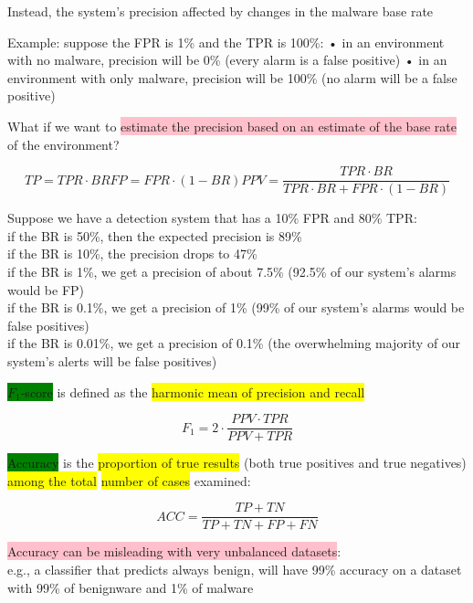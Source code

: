 \documentclass[]{project_plan}
\begin{document}
Instead, the system’s precision affected by changes in the malware base rate

Example: suppose the FPR is 1\% and the TPR is 100\%:
• in an environment with no malware, precision will be 0\% (every alarm is a false positive)
• in an environment with only malware, precision will be 100\% (no alarm will be a false positive)

What if we want to \colorbox{pink}{estimate the precision based on an estimate of the base rate} of the environment?

\[
  TP = TPR \cdot BR
  FP = FPR \cdot (1 - BR)
  PPV = \frac{TPR \cdot BR}{TPR \cdot BR + FPR \cdot (1 - BR)}
\]

Suppose we have a detection system that has a 10\% FPR and 80\% TPR:\\
if the BR is 50\%, then the expected precision is 89\%\\
if the BR is 10\%, the precision drops to 47\%\\
if the BR is 1\%, we get a precision of about 7.5\% (92.5\% of our system’s alarms would be FP)\\
if the BR is 0.1\%, we get a precision of 1\% (99\% of our system’s alarms would be false positives)\\
if the BR is 0.01\%, we get a precision of 0.1\% (the overwhelming majority of our system’s alerts will be false positives)

\colorbox{green}{$F_1$-score} is defined as the \colorbox{yellow}{harmonic mean of precision and recall}

\[
  F_1 = 2 \cdot \frac{PPV \cdot TPR}{PPV + TPR}
\]

\colorbox{green}{Accuracy} is the \colorbox{yellow}{proportion of true results} (both true positives and true negatives) \colorbox{yellow}{among the total} \colorbox{yellow}{number of cases} examined:

\[
  ACC = \frac{TP + TN}{TP + TN + FP + FN}
\]

\colorbox{pink}{Accuracy can be misleading with very unbalanced datasets}:\\
e.g., a classifier that predicts always benign, will have 99\% accuracy on a
dataset with 99\% of benignware and 1\% of malware
\end{document}
